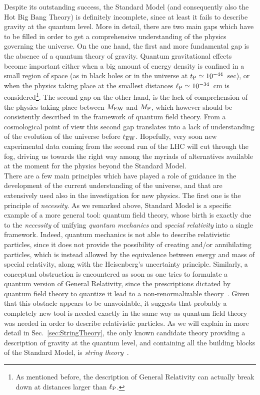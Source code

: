 \documentclass[12pt,a4paper]{book}
\begin{document}
Despite its outstanding success, the Standard Model (and consequently also the Hot Big Bang Theory) is definitely incomplete, since at least it fails to describe gravity at the quantum level. More in detail, there are two main gaps which have to be filled in order to get a comprehensive understanding of the physics governing the universe. On the one hand, the first and more fundamental gap is the absence of a quantum theory of gravity. Quantum gravitational effects become important either when a big amount of energy density is confined in a small region of space (as in black holes or in the universe at $t_{\rm P} \simeq 10^{-44} \,$ sec), or when the physics taking place at the smallest distances $\ell_{\rm P} \simeq 10^{-34} \,$ cm is considered\footnote{As mentioned before, the description of General Relativity can actually break down at distances larger than $\ell_{\rm P}$.}. The second gap on the other hand, is the lack of comprehension of the physics taking place between $M_{\rm EW}$ and $M_{\rm P}$, which however should be consistently described in the framework of quantum field theory. From a cosmological point of view this second gap translates into a lack of understanding of the evolution of the universe before $t_{\rm EW}$.  Hopefully, very soon new experimental data coming from the second run of the LHC will cut through the fog, driving us towards the right way among the myriads of alternatives available at the moment for the physics beyond the Standard Model.\\

There are a few main principles which have played a role of guidance in the development of the current understanding of the universe, and that are extensively used also in the investigation for new physics. The first one is the principle of \textit{necessity}. As we remarked above, Standard Model is a specific example of a more general tool: quantum field theory, whose birth is exactly due to the \textit{necessity} of unifying \textit{quantum mechanics} and \textit{special relativity} into a single framework. Indeed, quantum mechanics is not able to describe relativistic particles, since it does not provide the possibility of creating and/or annihilating particles, which is instead allowed by the equivalence between energy and mass of special relativity, along with the Heisenberg's uncertainty principle. Similarly, a conceptual obstruction is encountered as soon as one tries to formulate a quantum version of General Relativity, since the prescriptions dictated by quantum field theory to quantize it lead to a non-renormalizable theory~\cite{Nilles:1983ge, Cerdeno:1998hs}. Given that this obstacle appears to be unavoidable, it suggests that probably a completely new tool is needed exactly in the same way as quantum field theory was needed in order to describe relativistic particles. As we will explain in more detail in Sec.~\ref{sec:StringTheory}, the only known candidate theory providing a description of gravity at the quantum level, and containing all the building blocks of the Standard Model, is \textit{string theory}~\cite{Polchinski:1998rq, Polchinski:1998rr, Green:1987sp, Green:1987mn, Ibanez:2012zz}.\\
\end{document}
